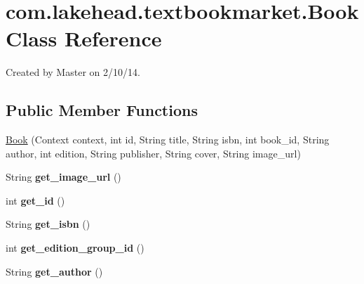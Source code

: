 \hypertarget{classcom_1_1lakehead_1_1textbookmarket_1_1_book}{\section{com.\-lakehead.\-textbookmarket.\-Book Class Reference}
\label{classcom_1_1lakehead_1_1textbookmarket_1_1_book}
}


Created by Master on 2/10/14.  


\subsection*{Public Member Functions}
\begin{DoxyCompactItemize}
\item 
\hyperlink{classcom_1_1lakehead_1_1textbookmarket_1_1_book_a39f1615488df558df19452a97030fbb8}{Book} (Context context, int id, String title, String isbn, int book\-\_\-id, String author, int edition, String publisher, String cover, String image\-\_\-url)
\item 
\hypertarget{classcom_1_1lakehead_1_1textbookmarket_1_1_book_a1b907f53ea57239fc9c8c70746cbd117}{String {\bfseries get\-\_\-image\-\_\-url} ()}\label{classcom_1_1lakehead_1_1textbookmarket_1_1_book_a1b907f53ea57239fc9c8c70746cbd117}

\item 
\hypertarget{classcom_1_1lakehead_1_1textbookmarket_1_1_book_a8147c6a05fcdc6ed08fb9078929283ae}{int {\bfseries get\-\_\-id} ()}\label{classcom_1_1lakehead_1_1textbookmarket_1_1_book_a8147c6a05fcdc6ed08fb9078929283ae}

\item 
\hypertarget{classcom_1_1lakehead_1_1textbookmarket_1_1_book_a38c3b71ffdabca5e6fe90f089489496a}{String {\bfseries get\-\_\-isbn} ()}\label{classcom_1_1lakehead_1_1textbookmarket_1_1_book_a38c3b71ffdabca5e6fe90f089489496a}

\item 
\hypertarget{classcom_1_1lakehead_1_1textbookmarket_1_1_book_aaa42e4651001aafe39f75b24a5b443a8}{int {\bfseries get\-\_\-edition\-\_\-group\-\_\-id} ()}\label{classcom_1_1lakehead_1_1textbookmarket_1_1_book_aaa42e4651001aafe39f75b24a5b443a8}

\item 
\hypertarget{classcom_1_1lakehead_1_1textbookmarket_1_1_book_a1f19ea8e60ddc90376792fb31b9769ed}{String {\bfseries get\-\_\-author} ()}\label{classcom_1_1lakehead_1_1textbookmarket_1_1_book_a1f19ea8e60ddc90376792fb31b9769ed}


\end{DoxyCompactItemize}
